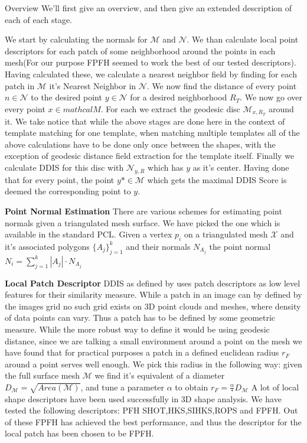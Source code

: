 \documentclass[10pt,twocolumn,letterpaper]{article}
\begin{document}
{\color{red} Overview}
We'll first give an overview, and then give an extended description of each of each stage. 

We start by calculating the normals for $\mathcal{M}$ and $\mathcal{N}$.
We than calculate local point descriptors for each patch of some neighborhood around the points in each mesh(For our purpose FPFH seemed to work the best of our tested descriptors). 
Having calculated these, we calculate a nearest neighbor field by finding for each patch in $\mathcal{M}$ it's Nearest Neighbor in $\mathcal{N}$. 
We now find the distance of every point $n\in \mathcal{N}$ to the desired point $y\in \mathcal{N}$ for a desired neighborhood $R_T$.
We now go over every point $x\in mathcal{M}$. For each we extract the geodesic disc $\mathcal{M}_{x,R_T}$ around it.
We take notice that while the above stages are done here in the context of template matching for one template, when matching multiple templates all of the above calculations have to be done only once between the shapes, with the exception of geodesic distance field extraction for the template itself. 
Finally we calculate DDIS for this disc with $\mathcal{N}_{y,R}$ which has $y$ as it's center. Having done that for every point, the point $y*\in \mathcal{M}$  which gets the maximal DDIS Score is deemed the corresponding point to $y$.


\textbf{Point Normal Estimation}
There are various schemes for estimating point normals given a triangulated mesh surface. We have picked the one which is available in the standard PCL. Given a vertex $p_i$ on a triangulated mesh $\mathcal{X}$ and it's associated polygons $\{A_j\}_{j=1}^k$ and their normals $N_{A_j}$ the point normal $N_i = \sum_{j=1}^k{|A_j|\cdot N_{A_j}}$

\textbf{Local Patch Descriptor}
DDIS as defined by \cite{talmi2017template} uses patch descriptors as low level features for their similarity measure. While a patch in an image can by defined by the images grid no such grid exists on 3D point clouds and meshes, where density of data points can vary. Thus a patch has to be defined by some geometric measure. While the more robust way to define it would be using geodesic distance, since we are talking a small environment around a point on the mesh we have found that for practical purposes a patch in a defined euclidean radius $r_F$ around a point serves well enough. We pick this radius in the following way: given the full surface mesh $\mathcal{M}$ we find it's equivalent of a diameter $D_\mathcal{M} = \sqrt{Area(\mathcal{M})}$, and tune a parameter $\alpha$ to obtain $r_{F} = \frac{\alpha}*D_\mathcal{M}$
A lot of local shape descriptors have been used successfully in 3D shape analysis. We have tested the following descriptors: PFH\cite{rusu2008learning} SHOT\cite{tombari2010unique},HKS\cite{Sun:2009:CPI:1735603.1735621},SIHKS\cite{bronstein2010scale},ROPS\cite{guo2013rotational} and FPFH\cite{rusu2009fast}. Out of these FPFH has achieved the best performance, and thus the descriptor for the local patch has been chosen to be FPFH. 
\end{document}
